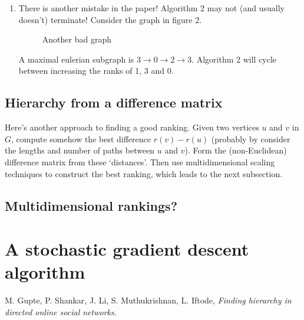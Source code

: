 \documentclass[11pt]{amsart}
\begin{document}
\begin{enumerate}
\item There is another mistake in the paper! Algorithm 2 may not (and usually doesn't) terminate! Consider the graph in figure 2. 
\begin{figure}[h]
\centering
{}
\caption{Another bad graph}
\label{gen}
\end{figure}
A maximal eulerian subgraph is $3 \to 0 \to 2 \to 3$. Algorithm 2 will cycle between increasing the ranks of 1, 3 and 0. 

\end{enumerate}


\subsection{Hierarchy from a difference matrix}

Here's another approach to finding a good ranking. Given two vertices $u$ and $v$ in $G$, compute somehow the best difference $r(v) - r(u)$ (probably by consider the lengths and number of paths between $u$ and $v$). Form the (non-Euclidean) difference matrix from these `distances'. Then use multidimensional scaling techniques to construct the best ranking, which leads to the next subsection. 

\subsection{Multidimensional rankings?}


\section{A stochastic gradient descent algorithm}


\begin{thebibliography}{4}


 M. Gupte, P. Shankar, J. Li, S. Muthukrishnan, L. Iftode, {\it Finding hierarchy in directed online social networks.}


\end{thebibliography}


 
\end{document}
